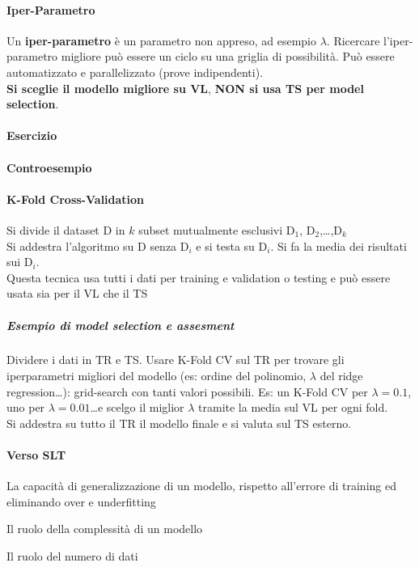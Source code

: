 \documentclass[10pt]{book}
\begin{document}
\paragraph{Iper-Parametro} Un \textbf{iper-parametro} è un parametro non appreso, ad esempio $\lambda$. Ricercare l'iper-parametro migliore può essere un ciclo su una griglia di possibilità. Può essere automatizzato e parallelizzato (prove indipendenti).\\
\textbf{Si sceglie il modello migliore su VL}, \textbf{NON si usa TS per model selection}.
\paragraph{Esercizio} %
\paragraph{Controesempio} %
\paragraph{K-Fold Cross-Validation} Si divide il dataset D in $k$ subset mutualmente esclusivi D$_1$, D$_2$,\ldots,D$_k$\\
Si addestra l'algoritmo su D senza D$_i$ e si testa su D$_i$. Si fa la media dei risultati sui D$_i$.\\
Questa tecnica usa tutti i dati per training e validation o testing e può essere usata sia per il VL che il TS
\subparagraph{Esempio di model selection e assesment} Dividere i dati in TR e TS. Usare K-Fold CV sul TR per trovare gli iperparametri migliori del modello (es: ordine del polinomio, $\lambda$ del ridge regression\ldots): grid-search con tanti valori possibili. Es: un K-Fold CV per $\lambda = 0.1$, uno per $\lambda = 0.01$\ldots e scelgo il miglior $\lambda$ tramite la media sul VL per ogni fold.\\
Si addestra su tutto il TR il modello finale e si valuta sul TS esterno.
\paragraph{Verso SLT} \begin{list}{Mettendo tutto insieme}{}
	\item La capacità di generalizzazione di un modello, rispetto all'errore di training ed eliminando over e underfitting
	\item Il ruolo della complessità di un modello
	\item Il ruolo del numero di dati
\end{list}
\end{document}
